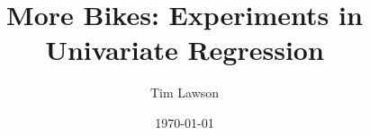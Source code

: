 \documentclass[11pt]{extarticle}
\begin{document}
\title{More Bikes: Experiments in Univariate Regression}
\author{Tim Lawson}
\date{\today}

\maketitle

\printbibliography
\end{document}
